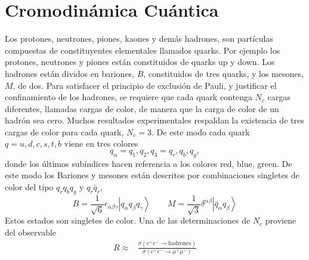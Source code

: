 \section{Cromodinámica Cuántica}
\label{sec:inter-fuert}
Los protones, neutrones, piones, kaones y demás hadrones, son partículas compuestas de constituyentes elementales llamados quarks. Por ejemplo los protones, neutrones y piones están constituidos de quarks up y down. Los hadrones están dividos en  bariones, $B$, constituidos de tres quarks, y los mesones, $M$, de dos. Para satisfacer el principio de exclusión de Pauli, y justificar el confinamiento de los hadrones, se requiere que cada quark contenga $N_c$ cargas diferentes, llamadas cargas de color, de manera que la carga de color de un hadrón sea cero. Muchos resultados experimentales respaldan la existencia de tres cargas de color para cada quark, $N_c=3$. De este modo cada quark $q=u,d,c,s,t,b$ viene en tres colores
\begin{equation}
  q_\alpha=q_1,q_2,q_3=q_r,q_b,q_g,
\end{equation}
donde los últimos subíndices hacen referencia a los colores red, blue, green. De este modo los Bariones y mesones están descritos por combinaciones singletes de color del tipo $q_r q_b q_g$ y $q_r\bar{q}_r$,
\begin{equation}
\label{eq:199qft}
  B=\frac{1}{\sqrt{6}}\epsilon_{\alpha\beta\gamma}
  \left|q_\alpha q_\beta q_\gamma\right\rangle \qquad M=\frac{1}{\sqrt{3}}\delta^{\alpha\beta}\left|\bar{q}_{\alpha}q_\beta\right\rangle
\end{equation}
Estos estados son singletes de color.
Una de las determinaciones de $N_c$ proviene del observable
\begin{align}
  R\approx&\frac{\sigma(e^+e^-\to\text{hadrones})}{\sigma(e^+e^-\to\mu^+\mu^-)}
\end{align}

